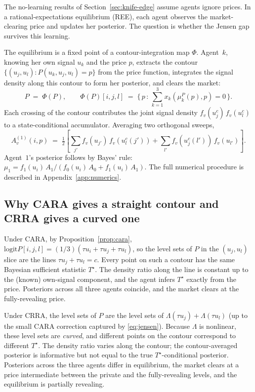 \documentclass[12pt,letterpaper]{article}
\theoremstyle{definition}
\theoremstyle{remark}
\newcommand{\Lam}{\Lambda}            %
\newcommand{\logit}{\mathrm{logit}}
\newcommand{\Tstar}{T^{\!\star}}
\newcommand{\1}{\mathbf{1}}
\begin{document}
The no-learning results of Section~\ref{sec:knife-edge} assume agents
ignore prices. In a rational-expectations equilibrium (REE), each agent
observes the market-clearing price and updates her posterior. The
question is whether the Jensen gap survives this learning.

The equilibrium is a fixed point of a contour-integration map
$\Phi$. Agent~$k$, knowing her own signal $u_k$ and the price $p$,
extracts the contour $\{(u_j,u_l): P(u_k,u_j,u_l)=p\}$ from the
price function, integrates the signal density along this contour to
form her posterior, and clears the market:
\begin{equation}
   P \;=\; \Phi(P), \qquad
   \Phi(P)[i,j,l] \;=\;
   \bigl\{\,p\,:\,\textstyle\sum_{k=1}^{3} x_{k}(\mu_{k}^{P}(p),p)=0\,\bigr\}.
\label{eq:fixed-point}
\end{equation}
Each crossing of the contour contributes the joint signal density
$f_{v}(u_{j}^{c})\,f_{v}(u_{l}^{c})$ to a state-conditional accumulator.
Averaging two orthogonal sweeps,
\begin{equation}
   A_{v}^{(1)}(i,p) \;=\;
   \tfrac12 \!\left[\sum_{j'} f_{v}(u_{j'})\,f_{v}(u_{l}^{c}(j'))
                 + \sum_{l'} f_{v}(u_{j}^{c}(l'))\,f_{v}(u_{l'})\right].
\label{eq:contour-integral}
\end{equation}
Agent~$1$'s posterior follows by Bayes' rule:
$\mu_{1} = f_{1}(u_{i})\,A_{1} / (f_{0}(u_{i})\,A_{0} + f_{1}(u_{i})\,A_{1})$.
\label{eq:contour-bayes}
The full numerical procedure is described in
Appendix~\ref{app:numerics}.

\subsection{Why CARA gives a straight contour and CRRA gives a curved one}

Under CARA, by Proposition~\ref{prop:cara}, $\logit P[i,j,l]
=(1/3)(\tau u_{i}+\tau u_{j}+\tau u_{l})$, so the level sets of $P$ in the
$(u_{j},u_{l})$ slice are the lines $\tau u_{j}+\tau u_{l}=c$. Every point on
such a contour has the same Bayesian sufficient statistic $\Tstar$. The
density ratio along the line is constant up to the (known) own-signal
component, and the agent infers $\Tstar$ exactly from the price. Posteriors
across all three agents coincide, and the market clears at the
fully-revealing price.

Under CRRA, the level sets of $P$ are the level sets of
\(\Lam(\tau u_{j})+\Lam(\tau u_{l})\) (up to the small CARA correction
captured by \eqref{eq:jensen}). Because $\Lam$ is nonlinear, these level
sets are \emph{curved}, and different points on the contour correspond to
different $\Tstar$. The density ratio varies along the contour; the
contour-averaged posterior is informative but not equal to the true
$\Tstar$-conditional posterior. Posteriors across the three agents differ
in equilibrium, the market clears at a price intermediate between the
private and the fully-revealing levels, and the equilibrium is partially
revealing.
\end{document}
